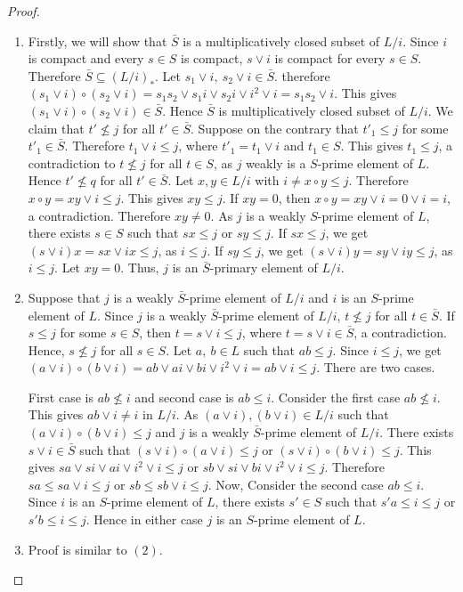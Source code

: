 \documentclass[10pt,twoside,a4paper]{amsart}
\numberwithin{equation}{section}
\theoremstyle{plain}
\theoremstyle{definition}
\begin{document}
\begin{proof}
	\begin{enumerate}
		\item Firstly, we will show that $\bar{S}$ is a multiplicatively closed subset of $L/i$. Since $i$ is compact and every $s \in S$ is compact, $s \vee i$ is compact for every $s \in S$. Therefore $\bar{S} \subseteq  (L/i)_*$. Let $s_1 \vee i, ~ s_2 \vee i \in \bar{S} $. therefore $(s_1 \vee i) \circ (s_2 \vee i) = s_1 s_2 \vee s_1 i \vee s_2 i \vee i^2 \vee i = s_1 s_2 \vee  i $. This gives $(s_1 \vee i) \circ (s_2 \vee i) \in \bar{S}$. Hence $\bar{S}$ is multiplicatively closed subset of $L/i$. We claim that $t' \nleq j$ for all $t' \in \bar{S}$. Suppose on the contrary that $t'_1 \leq j$ for some $t'_1 \in \bar{S}$. Therefore $t_1 \vee i \leq j$, where $t'_1 = t_1 \vee i$ and $t_1 \in S$. This gives $t_1 \leq j$, a contradiction to  $t \nleq j$ for all $t \in S$, as $j$ weakly is a $S$-prime element of $L$. Hence  $t' \nleq q$ for all $t' \in \bar{S}$.  Let $x, y \in L/i$ with $i\neq x \circ y \leq j$. 
		Therefore  $x \circ y  = xy \vee i \leq j$. This gives $xy \leq j$. If $xy=0$, then $x \circ y=xy\vee i=0\vee i=i$, a contradiction. Therefore $xy\neq 0$. As $j$ is a weakly $S$-prime element of $L$, there exists $s \in S$ such that $sx \leq j$ or $sy \leq j$.  If $sx \leq j$, we get $(s \vee i) x = sx \vee ix \leq j$, as $i \leq j$.  If $sy \leq j$, we get $(s \vee i) y = sy \vee iy \leq j$, as $i \leq j$.  
		Let $xy=0$.
		Thus, $j$ is an $\bar{S}$-primary element of $L/i$.
		
		\item Suppose that  $j$ is a weakly $\bar{S}$-prime element of $L/i$ and $i$ is an $S$-prime element of $L$. Since $j$ is a weakly $\bar{S}$-prime element of $L/i$, $t \nleq j$ for all $t \in \bar{S}$. If $s\leq j$ for some $s\in S$, then $t=s\vee i\leq j$, where $t=s\vee i\in \bar{S}$, a contradiction. Hence, $s\nleq j$ for all $s\in S$. Let $a,~b \in L$ such that $ab \leq j$. Since $i \leq j$, we get $(a \vee i ) \circ(b \vee i) = ab \vee ai \vee bi \vee i^2\vee i  = ab \vee i \leq j$. There are two cases. 
		
		First case is $ab \nleq i$ and second case is $ab \leq i$. Consider the first case $ab \nleq i$. This gives $ab \vee i \neq i$ in $L/i$.  As $(a \vee i), (b \vee i) \in L/i$ such that $(a \vee i ) \circ(b \vee i)\leq j$ and $j$ is a weakly $\bar{S}$-prime element of $L/i$.  There exists $s \vee i \in \bar{S}$ such that $(s \vee i) \circ(a \vee i) \leq j$ or $(s \vee i)\circ (b \vee i) \leq j$. This gives $sa \vee si \vee ai \vee i^2\vee i \leq j$ or $sb \vee si \vee bi \vee i^2 \vee i\leq j$.  Therefore $sa \leq sa \vee i \leq j $ or $sb \leq sb \vee i \leq j$. Now, Consider the  second case $ab \leq i$.  Since $i$ is an $S$-prime element of $L$, there exists $s' \in S$ such that $s'a \leq i \leq j$ or $ s'b \leq i \leq j$. Hence in either case $j$ is an $S$-prime element of $L$.
		
		\item Proof is similar to $(2)$.  
	\end{enumerate}
\end{proof}
\end{document}
